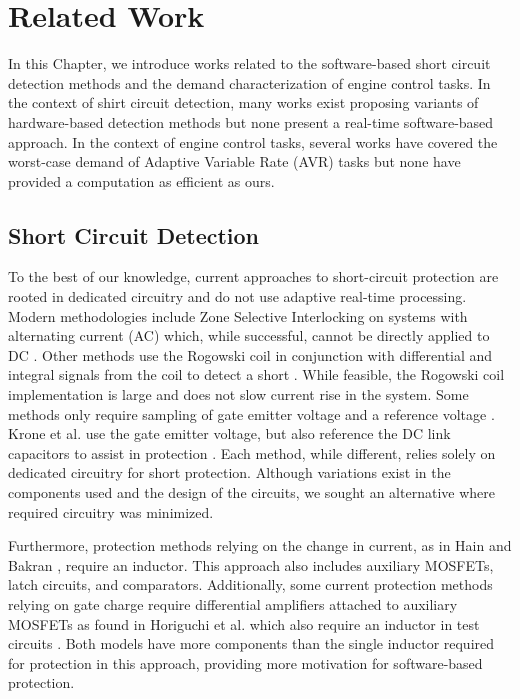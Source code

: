 \section{Related Work}   \label{chap:relatedWork}

In this Chapter, we introduce works related to the software-based short circuit detection methods and the demand characterization of engine control tasks.
In the context of shirt circuit detection, many works exist proposing variants of hardware-based detection methods but none present a real-time software-based approach.
In the context of engine control tasks, several works have covered the worst-case demand of Adaptive Variable Rate (AVR) tasks but none have provided a computation as efficient as ours.

\subsection{Short Circuit Detection} \label{subsec:scd-relatedWork}

To the best of our knowledge, current approaches to short-circuit protection are rooted in dedicated circuitry and do not use adaptive real-time processing.
Modern methodologies include Zone Selective Interlocking on systems with alternating current (AC) which, while successful, cannot be directly applied to DC \cite{scd}.
Other methods use the Rogowski coil in conjunction with differential and integral signals from the coil to detect a short \cite{rogowskiCoil}.
While feasible, the Rogowski coil implementation is large and does not slow current rise in the system.
Some methods only require sampling of gate emitter voltage and a reference voltage \cite{gateChargeChara}.
Krone et al. use the gate emitter voltage, but also reference the DC link capacitors to assist in protection \cite{fastAndEasilyImplementable}.
Each method, while different, relies solely on dedicated circuitry for short protection.
Although variations exist in the components used and the design of the circuits, we sought an alternative where required circuitry was minimized.

Furthermore, protection methods relying on the change in current, as in Hain and Bakran \cite{ultraFastSCD}, require an inductor.
This approach also includes auxiliary MOSFETs, latch circuits, and comparators.
Additionally, some current protection methods relying on gate charge require differential amplifiers attached to auxiliary MOSFETs as found in Horiguchi et al. which also require an inductor in test circuits \cite{hiSpeedProtection}.
Both models have more components than the single inductor required for protection in this approach, providing more motivation for software-based protection.

